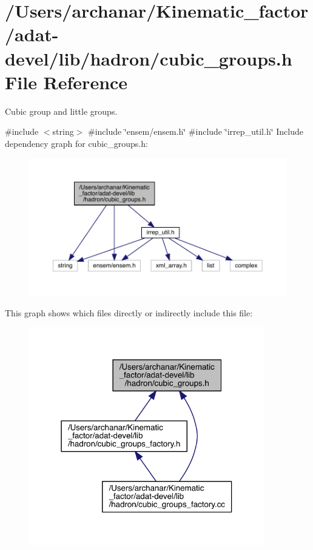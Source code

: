 \hypertarget{adat-devel_2lib_2hadron_2cubic__groups_8h}{}\section{/\+Users/archanar/\+Kinematic\+\_\+factor/adat-\/devel/lib/hadron/cubic\+\_\+groups.h File Reference}
\label{adat-devel_2lib_2hadron_2cubic__groups_8h}


Cubic group and little groups.  


{\ttfamily \#include $<$string$>$}\newline
{\ttfamily \#include \char`\"{}ensem/ensem.\+h\char`\"{}}\newline
{\ttfamily \#include \char`\"{}irrep\+\_\+util.\+h\char`\"{}}\newline
Include dependency graph for cubic\+\_\+groups.\+h\+:
\nopagebreak
\begin{figure}[H]
\begin{center}
\leavevmode
\includegraphics[width=350pt]{d9/d4d/adat-devel_2lib_2hadron_2cubic__groups_8h__incl}
\end{center}
\end{figure}
This graph shows which files directly or indirectly include this file\+:
\nopagebreak
\begin{figure}[H]
\begin{center}
\leavevmode
\includegraphics[width=291pt]{d4/dfb/adat-devel_2lib_2hadron_2cubic__groups_8h__dep__incl}
\end{center}
\end{figure}
